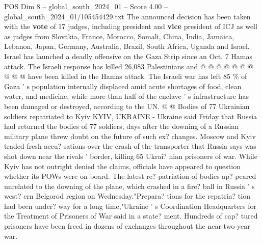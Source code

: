 \begin{textsample}{POS Dim 8 – global\_south\_2024\_01 – Score 4.00 – global\_south\_2024\_01/105454429.txt}
The announced decision has been taken with the \textbf{vote} of 17 judges, including president and \textbf{vice} president of ICJ as well as judges from Slovakia, France, Morocco, Somali, China, India, Jamaica, Lebanon, Japan, Germany, Australia, Brazil, South Africa, Uganda and Israel.
Israel has launched a deadly offensive on the Gaza Strip since an Oct. 7 Hamas attack.
The Israeli response has killed 26,083 Palestinians and @ @ @ @ @ @ @ @ @ @ have been killed in the Hamas attack.
The Israeli war has left 85 \% of Gaza ' s population internally displaced amid acute shortages of food, clean water, and medicine, while more than half of the enclave ' s infrastructure has been damaged or destroyed, according to the UN. @ @ Bodies of 77 Ukrainian soldiers repatriated to Kyiv KYIV, UKRAINE - Ukraine said Friday that Russia had returned the bodies of 77 soldiers, days after the downing of a Russian military plane threw doubt on the future of such ex? changes.
Moscow and Kyiv traded fresh accu? sations over the crash of the transporter that Russia says was shot down near the rivals ' border, killing 65 Ukrai? nian prisoners of war.
While Kyiv has not outright denied the claims, officials have appeared to question whether its POWs were on board.
The latest re? patriation of bodies ap? peared unrelated to the downing of the plane, which crashed in a fire? ball in Russia ' s west? ern Belgorod region on Wednesday."Prepara? tions for the repatria? tion had been under? way for a long time,"Ukraine ' s Coordination Headquarters for the Treatment of Prisoners of War said in a state? ment.
Hundreds of cap? tured prisoners have been freed in dozens of exchanges throughout the near two-year war.

\end{textsample}
